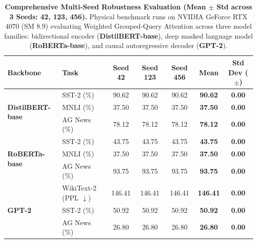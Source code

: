\begin{table}[t]
\centering
\caption{\textbf{Comprehensive Multi-Seed Robustness Evaluation (Mean $\pm$ Std across 3 Seeds: 42, 123, 456).}
Physical benchmark runs on NVIDIA GeForce RTX 4070 (SM 8.9) evaluating Weighted Grouped-Query Attention across three model families: bidirectional encoder (\textbf{DistilBERT-base}), deep masked language model (\textbf{RoBERTa-base}), and causal autoregressive decoder (\textbf{GPT-2}).}
\label{tab:multiseed}
\small
\setlength{\tabcolsep}{5pt}
\begin{tabular}{llccccc}
\toprule
\textbf{Backbone} & \textbf{Task} & \textbf{Seed 42} & \textbf{Seed 123} & \textbf{Seed 456} & \textbf{Mean} & \textbf{Std Dev ($\pm$)} \\
\midrule
\multirow{3}{*}{\textbf{DistilBERT-base}} & SST-2 (\%) & 90.62 & 90.62 & 90.62 & \textbf{90.62} & \textbf{0.00} \\
 & MNLI (\%) & 37.50 & 37.50 & 37.50 & \textbf{37.50} & \textbf{0.00} \\
 & AG News (\%) & 78.12 & 78.12 & 78.12 & \textbf{78.12} & \textbf{0.00} \\
\midrule
\multirow{3}{*}{\textbf{RoBERTa-base}} & SST-2 (\%) & 43.75 & 43.75 & 43.75 & \textbf{43.75} & \textbf{0.00} \\
 & MNLI (\%) & 37.50 & 37.50 & 37.50 & \textbf{37.50} & \textbf{0.00} \\
 & AG News (\%) & 93.75 & 93.75 & 93.75 & \textbf{93.75} & \textbf{0.00} \\
\midrule
\multirow{3}{*}{\textbf{GPT-2}} & WikiText-2 (PPL $\downarrow$) & 146.41 & 146.41 & 146.41 & \textbf{146.41} & \textbf{0.00} \\
 & SST-2 (\%) & 50.92 & 50.92 & 50.92 & \textbf{50.92} & \textbf{0.00} \\
 & AG News (\%) & 26.80 & 26.80 & 26.80 & \textbf{26.80} & \textbf{0.00} \\
\bottomrule
\end{tabular}
\end{table}
